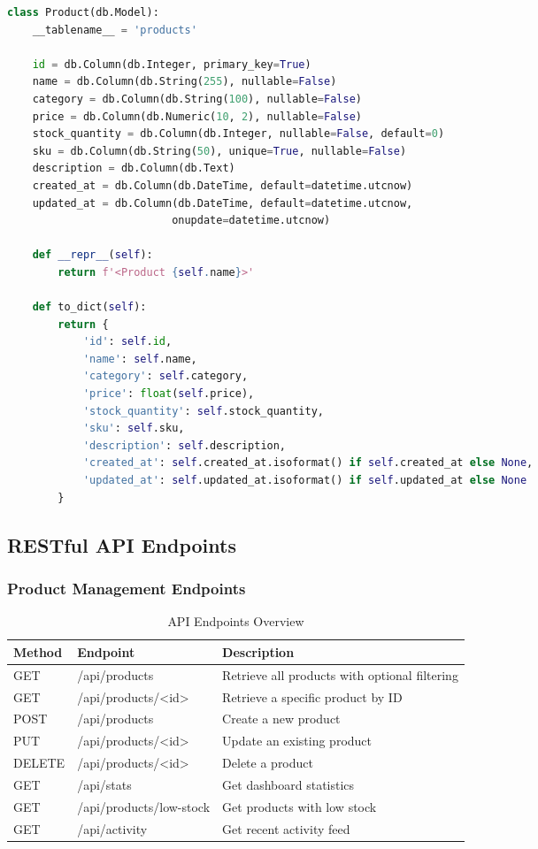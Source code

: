 \documentclass[12pt,a4paper]{article}
\begin{document}
\begin{lstlisting}[language=Python, caption=Product Model (models.py)]
class Product(db.Model):
    __tablename__ = 'products'
    
    id = db.Column(db.Integer, primary_key=True)
    name = db.Column(db.String(255), nullable=False)
    category = db.Column(db.String(100), nullable=False)
    price = db.Column(db.Numeric(10, 2), nullable=False)
    stock_quantity = db.Column(db.Integer, nullable=False, default=0)
    sku = db.Column(db.String(50), unique=True, nullable=False)
    description = db.Column(db.Text)
    created_at = db.Column(db.DateTime, default=datetime.utcnow)
    updated_at = db.Column(db.DateTime, default=datetime.utcnow, 
                          onupdate=datetime.utcnow)
    
    def __repr__(self):
        return f'<Product {self.name}>'
    
    def to_dict(self):
        return {
            'id': self.id,
            'name': self.name,
            'category': self.category,
            'price': float(self.price),
            'stock_quantity': self.stock_quantity,
            'sku': self.sku,
            'description': self.description,
            'created_at': self.created_at.isoformat() if self.created_at else None,
            'updated_at': self.updated_at.isoformat() if self.updated_at else None
        }
\end{lstlisting}

\subsection{RESTful API Endpoints}

\subsubsection{Product Management Endpoints}

\begin{table}[H]
\centering
\caption{API Endpoints Overview}
\begin{tabular}{@{}llp{8cm}@{}}
\toprule
\textbf{Method} & \textbf{Endpoint} & \textbf{Description} \\
\midrule
GET & /api/products & Retrieve all products with optional filtering \\
GET & /api/products/<id> & Retrieve a specific product by ID \\
POST & /api/products & Create a new product \\
PUT & /api/products/<id> & Update an existing product \\
DELETE & /api/products/<id> & Delete a product \\
GET & /api/stats & Get dashboard statistics \\
GET & /api/products/low-stock & Get products with low stock \\
GET & /api/activity & Get recent activity feed \\
\bottomrule
\end{tabular}
\end{table}
\end{document}
